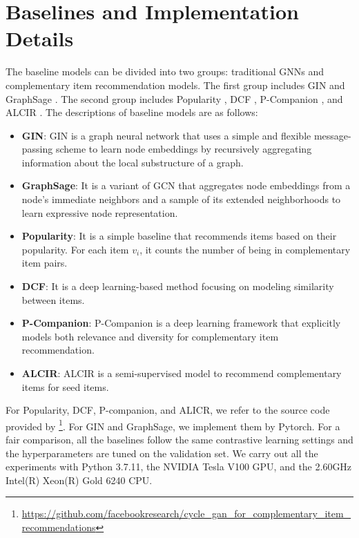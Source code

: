 \documentclass[letterpaper]{article} %
\begin{document}
 \section{Baselines and Implementation Details}
 The baseline models can be divided into two groups: traditional GNNs and complementary item recommendation models. The first group includes GIN \cite{xu2018powerful} and GraphSage \cite{hamilton2017inductive}. The second group includes Popularity \cite{bibas2023semi}, DCF \cite{galron2018deep}, P-Companion \cite{hao2020p}, and ALCIR \cite{bibas2023semi}. The descriptions of baseline models are as follows:
   \begin{itemize}
      \item \textbf{GIN}: GIN is a graph neural network that uses a simple and flexible message-passing scheme to learn node embeddings by recursively aggregating information about the local substructure of a graph.
    \item \textbf{GraphSage}:  It is a variant of GCN that aggregates node embeddings from a node's immediate neighbors and a sample of its extended neighborhoods to learn expressive node representation.
    \item \textbf{Popularity}: It is a simple baseline that recommends items based on their popularity. For each item $v_i$, it counts the number of being in complementary item pairs. 
    \item \textbf{DCF}: It is a deep learning-based method focusing on modeling similarity between items.
    \item \textbf{P-Companion}: P-Companion is a deep learning framework that explicitly models both relevance and diversity for complementary item recommendation.
    \item \textbf{ALCIR}: ALCIR is a semi-supervised model to recommend complementary items for seed items.
\end{itemize}
 For Popularity, DCF, P-companion, and ALICR, we refer to the source code provided by \cite{bibas2023semi} \footnote{\url{https://github.com/facebookresearch/cycle_gan_for_complementary_item_recommendations}}. For GIN and GraphSage, we implement them by Pytorch. For a fair comparison, all the baselines follow the same contrastive learning settings and the hyperparameters are tuned on the validation set. We carry out all the experiments with Python 3.7.11, the NVIDIA Tesla V100 GPU, and the 2.60GHz Intel(R) Xeon(R) Gold 6240 CPU. 
 
\end{document}
